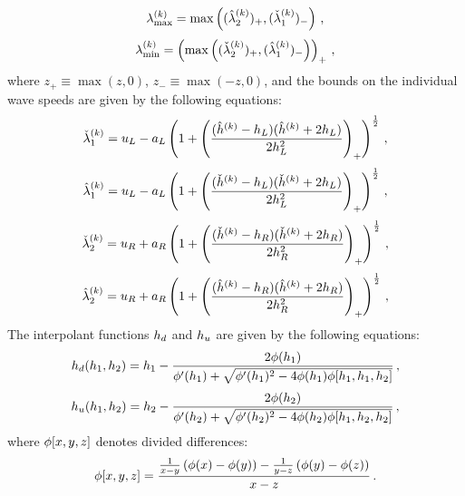 \begin{equation}\label{eq:maxwavespeedbound}
  \lambda_{\text{max}}^{(k)} = \max\left((\hat{\lambda}_2^{(k)})_+,
    (\check{\lambda}_1^{(k)})_-\right)
  \,,
\end{equation}
\begin{equation}\label{eq:minwavespeedbound}
  \lambda_{\text{min}}^{(k)} = \left(\max\left((\check{\lambda}_2^{(k)})_+,
    (\hat{\lambda}_1^{(k)})_-\right)\right)_+
  \,,
\end{equation}
where $z_+\equiv\max(z,0)$, $z_-\equiv\max(-z,0)$, and the bounds on the individual
wave speeds are given by the following equations:
\begin{equation}
  \check{\lambda}_1^{(k)}
    = u_L - a_L\left(1 + \left(
    \frac{(\hat{h}^{(k)} - h_L)(\hat{h}^{(k)}
    + 2h_L)}{2h_L^2}\right)_+\right)^{\frac{1}{2}}
    \,,
\end{equation}
\begin{equation}
  \hat{\lambda}_1^{(k)}
    = u_L - a_L\left(1 + \left(
    \frac{(\check{h}^{(k)} - h_L)(\check{h}^{(k)}
    + 2h_L)}{2h_L^2}\right)_+\right)^{\frac{1}{2}}
    \,,
\end{equation}
\begin{equation}
  \check{\lambda}_2^{(k)}
    = u_R + a_R\left(1 + \left(
    \frac{(\check{h}^{(k)} - h_R)(\check{h}^{(k)}
    + 2h_R)}{2h_R^2}\right)_+\right)^{\frac{1}{2}}
    \,,
\end{equation}
\begin{equation}
  \hat{\lambda}_2^{(k)}
    = u_R + a_R\left(1 + \left(
    \frac{(\hat{h}^{(k)} - h_R)(\hat{h}^{(k)}
    + 2h_R)}{2h_R^2}\right)_+\right)^{\frac{1}{2}}
    \,,
\end{equation}
The interpolant functions $h_d$ and $h_u$ are given by
the following equations:
\begin{equation}
  h_d(h_1,h_2) = h_1
    - \frac{2\phi(h_1)}{\phi'(h_1)
    + \sqrt{\phi'(h_1)^2 - 4\phi(h_1)\phi[h_1,h_1,h_2]}}
  \,,
\end{equation}
\begin{equation}
  h_u(h_1,h_2) = h_2
    - \frac{2\phi(h_2)}{\phi'(h_2)
    + \sqrt{\phi'(h_2)^2 - 4\phi(h_2)\phi[h_1,h_2,h_2]}}
  \,,
\end{equation}
where $\phi[x,y,z]$ denotes divided differences:
\begin{equation}
  \phi[x,y,z] = \frac{\frac{1}{x-y}\left(\phi(x)-\phi(y)\right)
    - \frac{1}{y-z}\left(\phi(y)-\phi(z)\right)}{x-z}
  \,.
\end{equation}

\pagebreak{}
